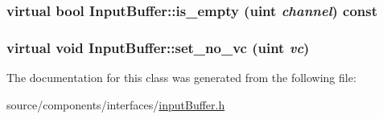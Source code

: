 \hypertarget{classInputBuffer_bc130ab26e953ef77b7faa804388cb90}{
\subsubsection[{is\_\-empty}]{\setlength{\rightskip}{0pt plus 5cm}virtual bool InputBuffer::is\_\-empty ({\bf uint} {\em channel}) const}}
\label{classInputBuffer_bc130ab26e953ef77b7faa804388cb90}


\hypertarget{classInputBuffer_27ff9889e0ec93036b06b161f948bc8f}{
\subsubsection[{set\_\-no\_\-vc}]{\setlength{\rightskip}{0pt plus 5cm}virtual void InputBuffer::set\_\-no\_\-vc ({\bf uint} {\em vc})}}
\label{classInputBuffer_27ff9889e0ec93036b06b161f948bc8f}




The documentation for this class was generated from the following file:\begin{CompactItemize}
\item 
source/components/interfaces/\hyperlink{inputBuffer_8h}{inputBuffer.h}\end{CompactItemize}
